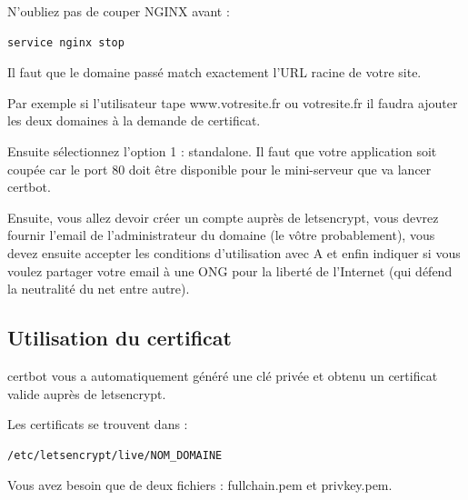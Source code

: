 \documentclass{article}
\begin{document}
N'oubliez pas de couper NGINX avant :
\begin{verbatim}
service nginx stop
\end{verbatim}

Il faut que le domaine passé match exactement l'URL racine de votre site.

Par exemple si l'utilisateur tape www.votresite.fr ou votresite.fr il faudra ajouter les deux domaines à la demande de certificat.

Ensuite sélectionnez l'option 1 : standalone. Il faut que votre application soit coupée car le port 80 doit être disponible pour le mini-serveur que va lancer certbot.

Ensuite, vous allez devoir créer un compte auprès de letsencrypt, vous devrez fournir l'email de l'administrateur du domaine (le vôtre probablement), vous devez ensuite accepter les conditions d'utilisation avec A et enfin indiquer si vous voulez partager votre email à une ONG pour la liberté de l'Internet (qui défend la neutralité du net entre autre).

\subsection{Utilisation du certificat}
certbot vous a automatiquement généré une clé privée et obtenu un certificat valide auprès de letsencrypt.

Les certificats se trouvent dans :
\begin{verbatim}
/etc/letsencrypt/live/NOM_DOMAINE
\end{verbatim}

Vous avez besoin que de deux fichiers : fullchain.pem et privkey.pem.
\end{document}
